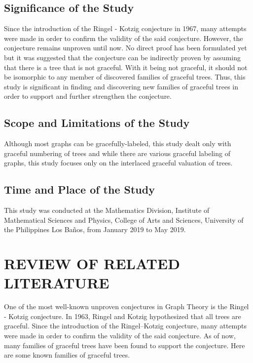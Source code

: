 \documentclass[12pt]{report}
\theoremstyle{definition}
\def\indent{\hspace*{.5cm}}
\begin{document}
\section{Significance of the Study}

\indent Since the introduction of the Ringel - Kotzig conjecture in 1967, many attempts were made in order to confirm the validity of the said conjecture. However, the conjecture remains unproven until now. No direct proof has been formulated yet but it was suggested that the conjecture can be indirectly proven by assuming that there is a tree that is not graceful. With it being not graceful, it should not be isomorphic to any member of discovered families of graceful trees. Thus, this study is significant in finding and discovering new families of graceful trees in order to support and further strengthen the conjecture.

\section{Scope and Limitations of the Study}

\indent Although most graphs can be gracefully-labeled, this study dealt only with graceful numbering of trees and while there are various graceful labeling of graphs, this study focuses only on the interlaced graceful valuation of trees.

\section{Time and Place of the Study}

\indent This study was conducted at the Mathematics Division, Institute of Mathematical Sciences and Physics, College of Arts and Sciences, University of the Philippines Los Ba\~{n}os, from January 2019 to May 2019.

\newpage
\chapter{REVIEW OF RELATED LITERATURE}
\thispagestyle{empty}

\indent
One of the most well-known unproven conjectures in Graph Theory is the Ringel - Kotzig conjecture. In 1963, Ringel and Kotzig hypothesized that all trees are graceful. Since the introduction of the Ringel–Kotzig conjecture, many attempts were made in order to confirm the validity of the said conjecture. As of now, many families of graceful trees have been found to support the conjecture. Here are some known families of graceful trees.
\end{document}
